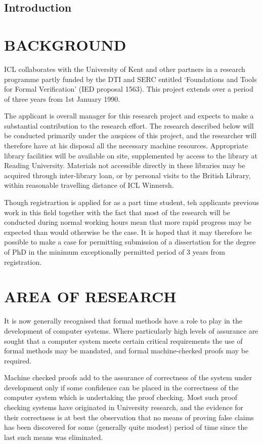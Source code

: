 \subsection{Introduction}
\section{BACKGROUND}
ICL collaborates with the University of Kent and other partners in a research programme partly funded by the DTI and SERC entitled `Foundations and Tools for Formal Verification' (IED proposal 1563).
This project extends over a period of three years from 1st January 1990.

The applicant is overall manager for this research project and expects to make a substantial contribution to the research effort.
The research described below will be conducted primarily under the auspices of this project, and the researcher will therefore have at his disposal all the necessary machine resources.
Appropriate library facilities will be available on site, supplemented by access to the library at Reading University.
Materials not accessible directly in these libraries may be acquired through inter-library loan, or by personal visits to the British Library, within reasonable travelling distance of ICL Winnersh.

Though registrartion is applied for as a part time student, teh applicants previous work in this field together with the fact that most of the research will be conducted during normal working hours mean that more rapid progress may be expected than would otherwise be the case.
It is hoped that it may therefore be possible to make a case for permitting submission of a dissertation for the degree of PhD in the minimum exceptionally permitted period of 3 years from registration.

\section{AREA OF RESEARCH}

It is now generally recognised that formal methods have a role to play in the development of computer systems.
Where particularly high levels of assurance are sought that a computer system meets certain critical requirements the use of formal methods may be mandated, and formal machine-checked proofs may be required.

Machine checked proofs add to the assurance of correctness of the system under development only if some confidence can be placed in the correctness of the computer system which is undertaking the proof checking.
Most such proof checking systems have originated in University research, and the evidence for their correctness is at best the observation that no means of proving false claims has been discovered for some (generally quite modest) period of time since the last such means was eliminated.

